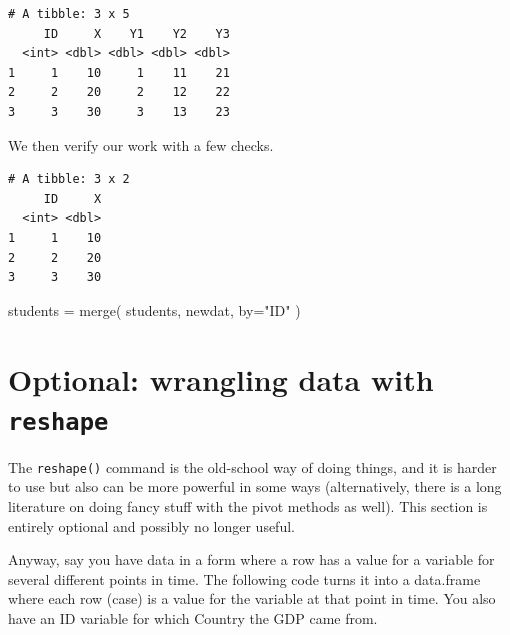\documentclass[
  letterpaper,
  DIV=11,
  numbers=noendperiod]{scrreprt}
\newenvironment{Shaded}{}{}
\newcommand{\AttributeTok}[1]{\textcolor[rgb]{0.49,0.56,0.16}{#1}}
\newcommand{\FunctionTok}[1]{\textcolor[rgb]{0.02,0.16,0.49}{#1}}
\newcommand{\NormalTok}[1]{#1}
\newcommand{\OtherTok}[1]{\textcolor[rgb]{0.00,0.44,0.13}{#1}}
\newcommand{\SpecialCharTok}[1]{\textcolor[rgb]{0.25,0.44,0.63}{#1}}
\newcommand{\StringTok}[1]{\textcolor[rgb]{0.25,0.44,0.63}{#1}}
\begin{document}
\begin{verbatim}
# A tibble: 3 x 5
     ID     X    Y1    Y2    Y3
  <int> <dbl> <dbl> <dbl> <dbl>
1     1    10     1    11    21
2     2    20     2    12    22
3     3    30     3    13    23
\end{verbatim}

We then verify our work with a few checks.

\begin{Shaded}
\end{Shaded}

\begin{verbatim}
# A tibble: 3 x 2
     ID     X
  <int> <dbl>
1     1    10
2     2    20
3     3    30
\end{verbatim}

\begin{Shaded}
\begin{Highlighting}[]
\NormalTok{students }\OtherTok{=} \FunctionTok{merge}\NormalTok{( students, newdat, }\AttributeTok{by=}\StringTok{"ID"}\NormalTok{ )}
\end{Highlighting}
\end{Shaded}

\section{\texorpdfstring{Optional: wrangling data with
\texttt{reshape}}{Optional: wrangling data with reshape}}\label{optional-wrangling-data-with-reshape}

The \texttt{reshape()} command is the old-school way of doing things,
and it is harder to use but also can be more powerful in some ways
(alternatively, there is a long literature on doing fancy stuff with the
pivot methods as well). This section is entirely optional and possibly
no longer useful.

Anyway, say you have data in a form where a row has a value for a
variable for several different points in time. The following code turns
it into a data.frame where each row (case) is a value for the variable
at that point in time. You also have an ID variable for which Country
the GDP came from.
\end{document}
